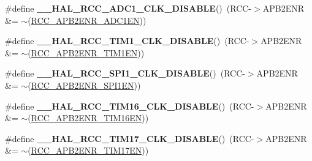 \begin{DoxyCompactItemize}
\item 
\mbox{\label{group___r_c_c___a_p_b2___clock___enable___disable_ga80a9e4852bac07d3d9cc6390a361302a}} 
\#define {\bfseries \+\_\+\+\_\+\+H\+A\+L\+\_\+\+R\+C\+C\+\_\+\+A\+D\+C1\+\_\+\+C\+L\+K\+\_\+\+D\+I\+S\+A\+B\+LE}()~(R\+CC-\/$>$A\+P\+B2\+E\+NR \&= $\sim$(\hyperlink{group___peripheral___registers___bits___definition_ga57b9f50cb96a2e4ceba37728b4a32a42}{R\+C\+C\+\_\+\+A\+P\+B2\+E\+N\+R\+\_\+\+A\+D\+C1\+EN}))
\item 
\mbox{\label{group___r_c_c___a_p_b2___clock___enable___disable_gaa9eacfb8ee244074ec63dae0b9f621c2}} 
\#define {\bfseries \+\_\+\+\_\+\+H\+A\+L\+\_\+\+R\+C\+C\+\_\+\+T\+I\+M1\+\_\+\+C\+L\+K\+\_\+\+D\+I\+S\+A\+B\+LE}()~(R\+CC-\/$>$A\+P\+B2\+E\+NR \&= $\sim$(\hyperlink{group___peripheral___registers___bits___definition_ga25852ad4ebc09edc724814de967816bc}{R\+C\+C\+\_\+\+A\+P\+B2\+E\+N\+R\+\_\+\+T\+I\+M1\+EN}))
\item 
\mbox{\label{group___r_c_c___a_p_b2___clock___enable___disable_gaf2ccb5c6b63a60deb6463cbc629c10fe}} 
\#define {\bfseries \+\_\+\+\_\+\+H\+A\+L\+\_\+\+R\+C\+C\+\_\+\+S\+P\+I1\+\_\+\+C\+L\+K\+\_\+\+D\+I\+S\+A\+B\+LE}()~(R\+CC-\/$>$A\+P\+B2\+E\+NR \&= $\sim$(\hyperlink{group___peripheral___registers___bits___definition_gae08a3510371b9234eb96369c91d3552f}{R\+C\+C\+\_\+\+A\+P\+B2\+E\+N\+R\+\_\+\+S\+P\+I1\+EN}))
\item 
\mbox{\label{group___r_c_c___a_p_b2___clock___enable___disable_ga4f23f7c1565e07731f200059c8ed4db9}} 
\#define {\bfseries \+\_\+\+\_\+\+H\+A\+L\+\_\+\+R\+C\+C\+\_\+\+T\+I\+M16\+\_\+\+C\+L\+K\+\_\+\+D\+I\+S\+A\+B\+LE}()~(R\+CC-\/$>$A\+P\+B2\+E\+NR \&= $\sim$(\hyperlink{group___peripheral___registers___bits___definition_gaece1d96f631bcf146e5998314fd90910}{R\+C\+C\+\_\+\+A\+P\+B2\+E\+N\+R\+\_\+\+T\+I\+M16\+EN}))
\item 
\mbox{\label{group___r_c_c___a_p_b2___clock___enable___disable_ga6c046db26bd6495179e6171dc6caeff3}} 
\#define {\bfseries \+\_\+\+\_\+\+H\+A\+L\+\_\+\+R\+C\+C\+\_\+\+T\+I\+M17\+\_\+\+C\+L\+K\+\_\+\+D\+I\+S\+A\+B\+LE}()~(R\+CC-\/$>$A\+P\+B2\+E\+NR \&= $\sim$(\hyperlink{group___peripheral___registers___bits___definition_ga29e566fb62e24640c55693324801d87c}{R\+C\+C\+\_\+\+A\+P\+B2\+E\+N\+R\+\_\+\+T\+I\+M17\+EN}))

\end{DoxyCompactItemize}
